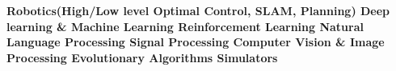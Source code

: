 \begin{cventries}
\begin{flushleft}
\textbf{{\fontsize{10pt}{1em}\bodyfontlight\upshape\color{text}  
    \bullet \space \textbf{Robotics(High/Low level Optimal Control, SLAM, Planning)}\newline
    \bullet \space \textbf{Deep learning \& Machine Learning}\newline
    \bullet \space \textbf{Reinforcement Learning}\newline
    \bullet \space \textbf{Natural Language Processing}\newline
    \bullet \space \textbf{Signal Processing}\newline
    \bullet \space \textbf{Computer Vision \& Image Processing}\newline
    \bullet \space \textbf{Evolutionary Algorithms}\newline
    \bullet \space \textbf{Simulators}}}
\end{flushleft}
\end{cventries}
